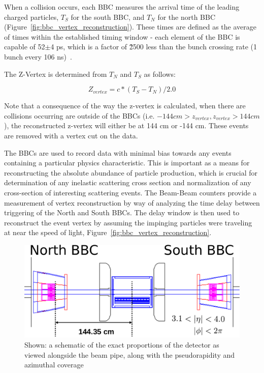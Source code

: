 When a collision occurs, each BBC measures the arrival time of the leading
charged particles, $T_S$ for the south BBC, and $T_N$ for the north BBC
(Figure~\ref{fig:bbc_vertex_reconstruction}). These times are defined as the
average of times within the established timing window - each element of the BBC
is capable of 52$\pm$4 ps, which is a factor of \~2500 less than the bunch
crossing rate (1 bunch every 106 ns)~\cite{Allen2003}.

The Z-Vertex is determined from $T_N$ and $T_S$ as follows:

\begin{equation}
  Z_{vertex} = c * (T_S - T_N) / 2.0
  \label{eq:zvtx_calc}
\end{equation}

{\noindent}Note that a consequence of the way the z-vertex is calculated, when
there are collisions occurring are outside of the BBCs (i.e. $-144 cm >
z_{vertex}, z_{vertex} > 144 cm$), the reconstructed z-vertex will either be at
144 cm or -144 cm.  These events are removed with a vertex cut on the data.

The BBCs are used to record data with minimal bias towards any events
containing a particular physics characteristic. This is important as a means
for reconstructing the absolute abundance of particle production, which is
crucial for determination of any inelastic scattering cross section and
normalization of any cross-section of interesting scattering events.  The
Beam-Beam counters provide a measurement of vertex reconstruction by way of
analyzing the time delay between triggering of the North and South BBCs.  The
delay window is then used to reconstruct the event vertex by assuming the
impinging particles were traveling at near the speed of light,
Figure~\ref{fig:bbc_vertex_reconstruction}. 

\begin{figure}[ht]
  \centering
  \includegraphics[width=\linewidth]{./figures/bbc_overview.pdf}
  \caption{
    Shown: a schematic of the exact proportions of the detector as viewed
    alongside the beam pipe, along with the pseudorapidity and azimuthal
    coverage~\cite{Nakamura2002}
  }
  \label{fig:bbc_overview}
\end{figure}

